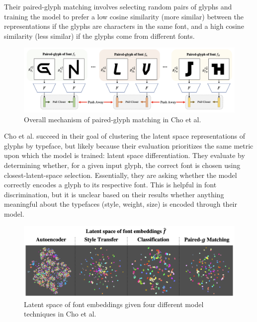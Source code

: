 Their paired-glyph matching involves selecting random pairs of glyphs and training the model to prefer a low cosine similarity (more similar) between the representations if the glyphs are characters in the same font, and a high cosine similarity (less similar) if the glyphs come from different fonts.

\begin{figure}[h]
    \centering
    \includegraphics[width=1\textwidth]{images/cho-paired-glyph.png}
    \caption{Overall mechanism of paired-glyph matching in Cho et al.}
    \label{fig:cho-paired-glyph}
\end{figure}

Cho et al. succeed in their goal of clustering the latent space representations of glyphs by typeface, but likely because their evaluation prioritizes the same metric upon which the model is trained: latent space differentiation. They evaluate by determining whether, for a given input glyph, the correct font is chosen using closest-latent-space selection. Essentially, they are asking whether the model correctly encodes a glyph to its respective font. This is helpful in font discrimination, but it is unclear based on their results whether anything meaningful about the typefaces (style, weight, size) is encoded through their model.

\begin{figure}[h]
    \centering
    \includegraphics[width=1\textwidth]{images/cho-latent-space.png}
    \caption{Latent space of font embeddings given four different model techniques in Cho et al.}
    \label{fig:cho-latent-space}
\end{figure}

